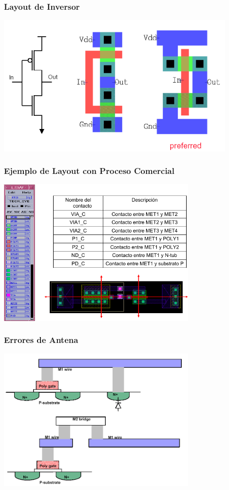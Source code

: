\documentclass[aspectratio=169,10pt]{beamer}
\begin{document}
\begin{frame}[t]
\frametitle{Layout de Inversor}
\centering
\includegraphics[width=12cm]{inverter}
\end{frame}


\begin{frame}[t]
\frametitle{Ejemplo de Layout con Proceso Comercial}
\centering
\includegraphics[width=10cm]{layout2}
\end{frame}


\begin{frame}[t]
\frametitle{Errores de Antena}
\centering
\includegraphics[width=10cm]{antenna}
\end{frame}
\end{document}
